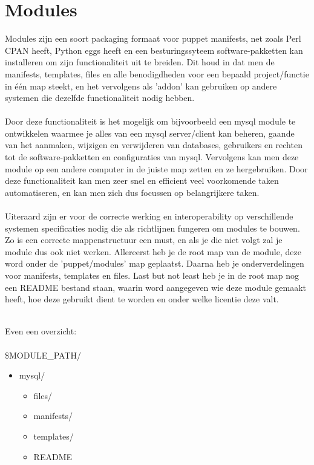 \chapter{Modules}

Modules zijn een soort packaging formaat voor puppet manifests, net zoals Perl CPAN heeft, Python eggs heeft en een besturingssyteem software-pakketten kan installeren om zijn functionaliteit uit te breiden. Dit houd in dat men de manifests, templates, files en alle benodigdheden voor een bepaald project/functie in \'{e}\'{e}n map steekt, en het vervolgens als 'addon' kan gebruiken op andere systemen die dezelfde functionaliteit nodig hebben.\\\\
Door deze functionaliteit is het mogelijk om bijvoorbeeld een mysql module te ontwikkelen waarmee je alles van een mysql server/client kan beheren, gaande van het aanmaken, wijzigen en verwijderen van databases, gebruikers en rechten tot de software-pakketten en configuraties van mysql. Vervolgens kan men deze module op een andere computer in de juiste map zetten en ze hergebruiken. Door deze functionaliteit kan men zeer snel en efficient veel voorkomende taken automatiseren, en kan men zich dus focussen op belangrijkere taken.\\\\
Uiteraard zijn er voor de correcte werking en interoperability op verschillende systemen specificaties nodig die als richtlijnen fungeren om modules te bouwen. Zo is een correcte mappenstructuur een must, en als je die niet volgt zal je module dus ook niet werken. Allereerst heb je de root map van de module, deze word onder de 'puppet/modules' map geplaatst. Daarna heb je onderverdelingen voor manifests, templates en files. Last but not least heb je in de root map nog een README bestand staan, waarin word aangegeven wie deze module gemaakt heeft, hoe deze gebruikt dient te worden en onder welke licentie deze valt.\\\\
\begin{samepage}
Even een overzicht:\\\\
\$MODULE\_PATH/
	\begin{itemize}
	\item mysql/
		\begin{itemize}
		\item files/
		\item manifests/
		\item templates/
		\item README
		\end{itemize}
	\end{itemize}
\end{samepage}

